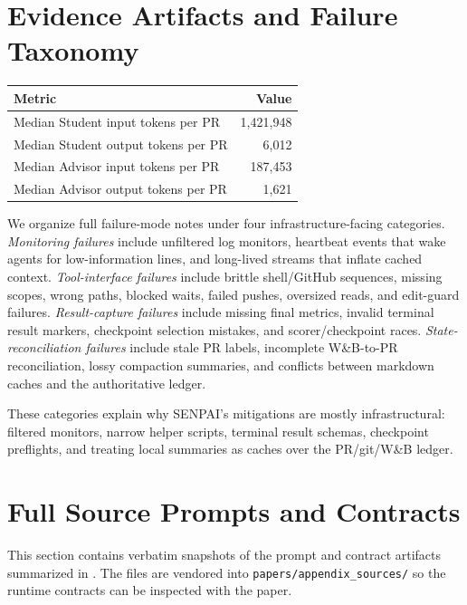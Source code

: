 \documentclass{article}
\begin{document}
\section{Evidence Artifacts and Failure Taxonomy}
\label{app:evidence-taxonomy}

\begin{center}
  \label{tab:app-pr-token-load}
  \small
  \begin{tabular}{@{}lr@{}}
    \toprule
    Metric & Value \\
    \midrule
    Median Student input tokens per PR & 1,421,948 \\
    Median Student output tokens per PR & 6,012 \\
    Median Advisor input tokens per PR & 187,453 \\
    Median Advisor output tokens per PR & 1,621 \\
    \bottomrule
  \end{tabular}
\end{center}

We organize full failure-mode notes under four infrastructure-facing categories. \textit{Monitoring failures} include unfiltered log monitors, heartbeat events that wake agents for low-information lines, and long-lived streams that inflate cached context. \textit{Tool-interface failures} include brittle shell/GitHub sequences, missing scopes, wrong paths, blocked waits, failed pushes, oversized reads, and edit-guard failures. \textit{Result-capture failures} include missing final metrics, invalid terminal result markers, checkpoint selection mistakes, and scorer/checkpoint races. \textit{State-reconciliation failures} include stale PR labels, incomplete W\&B-to-PR reconciliation, lossy compaction summaries, and conflicts between markdown caches and the authoritative ledger.

These categories explain why SENPAI's mitigations are mostly infrastructural: filtered monitors, narrow helper scripts, terminal result schemas, checkpoint preflights, and treating local summaries as caches over the PR/git/W\&B ledger.

\section{Full Source Prompts and Contracts}
\label{app:full-prompts}

This section contains verbatim snapshots of the prompt and contract artifacts summarized in . The files are vendored into \texttt{papers/appendix\_sources/} so the runtime contracts can be inspected with the paper.
\end{document}
